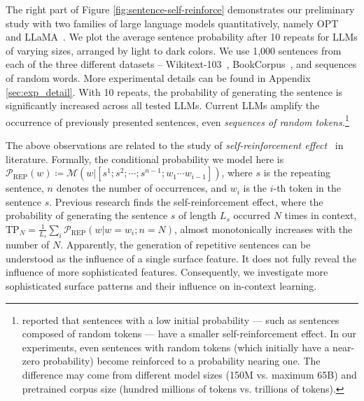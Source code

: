 \documentclass{article} %
\def\chenming#1{{\color{red}{\bf [Chenming:} {{#1}}{\bf ]}}}
\begin{document}
The right part of Figure \ref{fig:sentence-self-reinforce} demonstrates our preliminary study with two families of large language models quantitatively, namely OPT~\citep{zhang2022opt} and LLaMA~\citep{touvron2023llama}. 
We plot the average sentence probability after 10 repeats for LLMs of varying sizes, arranged by light to dark colors.
We use 1,000 sentences from each of the three different datasets -- Wikitext-103~\citep{merity2016pointer}, BookCorpus~\citep{Zhu_2015_ICCV}, and sequences of random words. More experimental details can be found in Appendix \ref{sec:exp_detail}.
With 10 repeats, the probability of generating the sentence is significantly increased across all tested LLMs.
Current LLMs amplify the occurrence of previously presented sentences, even \emph{sequences of random tokens.}\footnote{\cite{xu2022learning} reported that sentences with a low initial probability — such as sentences composed of random tokens — have a smaller self-reinforcement effect.
In our experiments, even sentences with random tokens (which initially have a near-zero probability) become reinforced to a probability nearing one. 
The difference may come from different model sizes (150M vs. maximum 65B) and pretrained corpus size (hundred millions of tokens vs. trillions of tokens). }

The above observations are related to the study of \emph{self-reinforcement effect}~\citep{xu2022learning} in literature. 
Formally, the conditional probability we model here is $\mathcal{P}_{\text{REP}}(w) \coloneqq \mathcal{M}(w|[s^1;s^2;\cdots;s^{n-1};w_1 \cdots w_{i-1}])$, where $s$ is the repeating sentence, $n$ denotes the number of occurrences, and $w_i$ is the $i$-th token in the sentence $s$.
Previous research finds the self-reinforcement effect, where the probability of generating the sentence $s$ of length $L_s$ occurred $N$ times in context, $\text{TP}_N = \frac{1}{L_s}\sum_{i}\mathcal{P}_{\text{REP}}(w|w=w_i; n=N)$, almost monotonically increases with the number of $N$. 
Apparently, the generation of repetitive sentences can be understood as the influence of a single surface feature. It does not fully reveal the influence of more sophisticated features. 
Consequently, we investigate more sophisticated surface patterns and their influence on in-context learning. 
\end{document}
